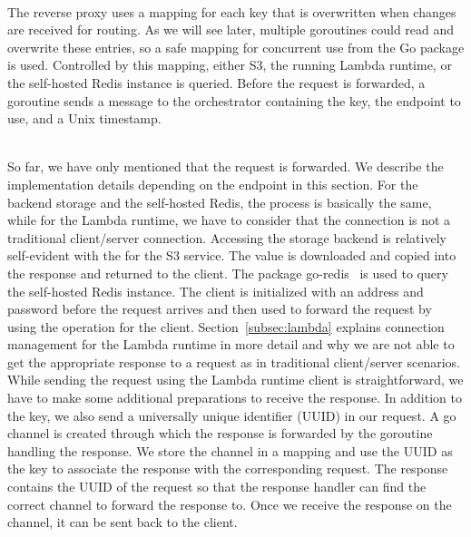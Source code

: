 ~\\
The reverse proxy uses a mapping for each key that is overwritten when changes are received for routing. As we will see later, multiple goroutines could read and overwrite these entries, so a safe mapping for concurrent use from the Go package  is used. Controlled by this mapping, either S3, the running Lambda runtime, or the self-hosted Redis instance is queried. Before the request is forwarded, a goroutine sends a message to the orchestrator containing the key, the endpoint to use, and a Unix timestamp.

~\\
So far, we have only mentioned that the request is forwarded. We describe the implementation details depending on the endpoint in this section. For the backend storage and the self-hosted Redis, the process is basically the same, while for the Lambda runtime, we have to consider that the connection is not a traditional client/server connection. Accessing the storage backend is relatively self-evident with the  for the S3 service. The value is downloaded and copied into the response and returned to the client. The package go-redis~\cite{noauthor_redis_nodate-1} is used to query the self-hosted Redis instance. The client is initialized with an address and password before the request arrives and then used to forward the request by using the  operation for the client. Section~\ref{subsec:lambda} explains connection management for the Lambda runtime in more detail and why we are not able to get the appropriate response to a request as in traditional client/server scenarios. While sending the request using the Lambda runtime client is straightforward, we have to make some additional preparations to receive the response. In addition to the key, we also send a universally unique identifier (UUID) in our  request. A go channel is created through which the response is forwarded by the goroutine handling the response. We store the channel in a mapping and use the UUID as the key to associate the response with the corresponding request. The response contains the UUID of the request so that the response handler can find the correct channel to forward the response to. Once we receive the response on the channel, it can be sent back to the client.

